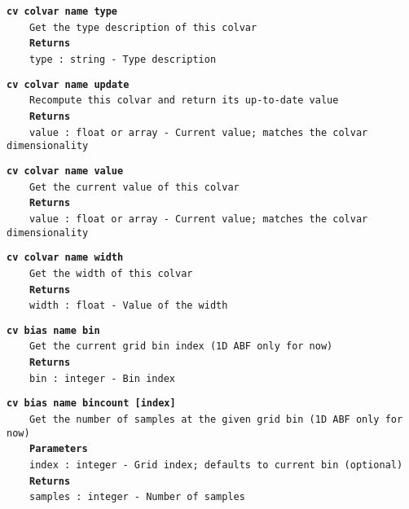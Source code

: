 \begin{mdexampleinput}{}
\texttt{\textbf{cv colvar name type}}
\\
\-~~~~\texttt{Get the type description of this colvar}
\\
\-~~~~\texttt{\textbf{Returns}}
\\
\-~~~~\texttt{type : string - Type description}
\end{mdexampleinput}
\begin{mdexampleinput}{}
\texttt{\textbf{cv colvar name update}}
\\
\-~~~~\texttt{Recompute this colvar and return its up-to-date value}
\\
\-~~~~\texttt{\textbf{Returns}}
\\
\-~~~~\texttt{value : float or array - Current value; matches the colvar dimensionality}
\end{mdexampleinput}
\begin{mdexampleinput}{}
\texttt{\textbf{cv colvar name value}}
\\
\-~~~~\texttt{Get the current value of this colvar}
\\
\-~~~~\texttt{\textbf{Returns}}
\\
\-~~~~\texttt{value : float or array - Current value; matches the colvar dimensionality}
\end{mdexampleinput}
\begin{mdexampleinput}{}
\texttt{\textbf{cv colvar name width}}
\\
\-~~~~\texttt{Get the width of this colvar}
\\
\-~~~~\texttt{\textbf{Returns}}
\\
\-~~~~\texttt{width : float - Value of the width}
\end{mdexampleinput}
\begin{mdexampleinput}{}
\texttt{\textbf{cv bias name bin}}
\\
\-~~~~\texttt{Get the current grid bin index (1D ABF only for now)}
\\
\-~~~~\texttt{\textbf{Returns}}
\\
\-~~~~\texttt{bin : integer - Bin index}
\end{mdexampleinput}
\begin{mdexampleinput}{}
\texttt{\textbf{cv bias name bincount [index]}}
\\
\-~~~~\texttt{Get the number of samples at the given grid bin (1D ABF only for now)}
\\
\-~~~~\texttt{\textbf{Parameters}}
\\
\-~~~~\texttt{index : integer - Grid index; defaults to current bin (optional)}
\\
\-~~~~\texttt{\textbf{Returns}}
\\
\-~~~~\texttt{samples : integer - Number of samples}
\end{mdexampleinput}
